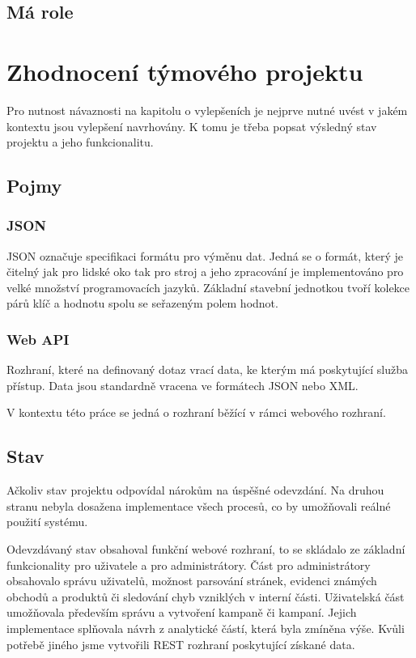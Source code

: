 \documentclass[thesis=B,czech]{FITthesis}[2012/06/26]
\begin{document}
\section{Má role}

\chapter{Zhodnocení týmového projektu}
Pro nutnost návaznosti na kapitolu o vylepšeních je nejprve nutné uvést v jakém kontextu jsou vylepšení navrhovány. K tomu je třeba
popsat výsledný stav projektu a jeho funkcionalitu. 

\section{Pojmy}

\subsection{JSON}
JSON označuje specifikaci formátu pro výměnu dat\cite{JSON}. Jedná se o formát, který je čitelný jak pro lidské oko tak pro stroj\cite{JSON} a jeho zpracování je implementováno pro velké množství programovacích jazyků\cite{JSON-impl}. Základní stavební jednotkou
tvoří kolekce párů klíč a hodnotu spolu se seřazeným polem hodnot.

\subsection{Web API}
Rozhraní, které na definovaný dotaz vrací data, ke kterým má poskytující služba přístup. Data jsou standardně vracena ve
formátech JSON nebo XML.

V kontextu této práce se jedná o rozhraní běžící v rámci webového rozhraní.


\section{Stav}
Ačkoliv stav projektu odpovídal nárokům na úspěšné odevzdání. Na druhou stranu nebyla dosažena implementace všech procesů, co by 
umožňovali reálné použití systému.
\par
Odevzdávaný stav obsahoval funkční webové rozhraní, to se skládalo ze základní funkcionality pro uživatele a pro administrátory.
Část pro administrátory obsahovalo správu uživatelů, možnost parsování stránek, evidenci známých obchodů a produktů či sledování
chyb vzniklých v interní části.
Uživatelská část umožňovala především správu a vytvoření kampaně či kampaní. Jejich implementace splňovala návrh z analytické částí,
která byla zmíněna výše.
Kvůli potřebě jiného jsme vytvořili REST rozhraní poskytující získané data.
\par
\end{document}
